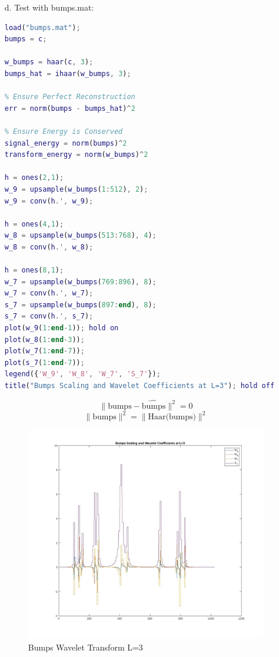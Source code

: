 \documentclass[12pt]{article}
\begin{document}
\begin{enumerate}
\begin{enumerate}
\newpage
\begin{tabbing}
    
\end{tabbing}
\newpage

\item[d.] Test with bumps.mat:
\begin{lstlisting}[language=matlab]
load("bumps.mat");
bumps = c;

w_bumps = haar(c, 3);
bumps_hat = ihaar(w_bumps, 3);

% Ensure Perfect Reconstruction
err = norm(bumps - bumps_hat)^2

% Ensure Energy is Conserved
signal_energy = norm(bumps)^2
transform_energy = norm(w_bumps)^2

h = ones(2,1);
w_9 = upsample(w_bumps(1:512), 2);
w_9 = conv(h.', w_9);

h = ones(4,1);
w_8 = upsample(w_bumps(513:768), 4);
w_8 = conv(h.', w_8);

h = ones(8,1);
w_7 = upsample(w_bumps(769:896), 8);
w_7 = conv(h.', w_7);
s_7 = upsample(w_bumps(897:end), 8);
s_7 = conv(h.', s_7);
plot(w_9(1:end-1)); hold on
plot(w_8(1:end-3));
plot(w_7(1:end-7));
plot(s_7(1:end-7)); 
legend({'W_9', 'W_8', 'W_7', 'S_7'}); 
title("Bumps Scaling and Wavelet Coefficients at L=3"); hold off
\end{lstlisting}

\begin{framed}
\[\|\text{bumps}-\hat{\text{bumps}}\|^2 = 0\]
\[\|\text{bumps}\|^2 = \|\text{Haar(bumps)}\|^2\]
\end{framed}

\begin{figure}[h]
    \caption{Bumps Wavelet Transform L=3}
    \centering
    \includegraphics[scale=0.4]{6-2a.jpg}
\end{figure}

\end{enumerate}

\end{enumerate}
\end{document}
